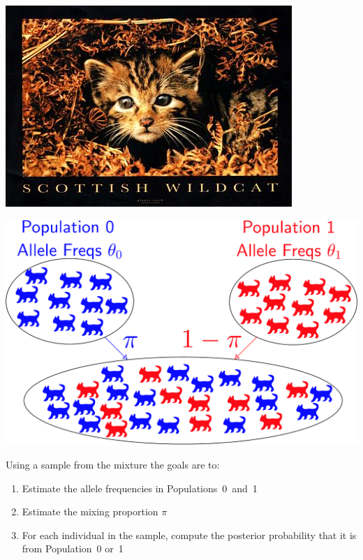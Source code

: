 
%



\begin{center}
\includegraphics[width=.8\textwidth]{illus/ScottishKitty.jpg}
\end{center}


\vspace*{-.3in}
\begin{center}
\includegraphics*[width=.65\textwidth]{illus/mixture_cats.pdf}
\end{center}
\noindent Using a sample from the mixture the goals are to:
\vspace*{-.9ex}
\begin{enumerate}
\item Estimate the allele frequencies in Populations~0~and~1
\vspace*{-.9ex}
\item Estimate the mixing proportion $\pi$ \vspace*{-.9ex}
\item For each individual in the sample, compute the posterior
probability that it is from Population~0 or~1
\end{enumerate}


